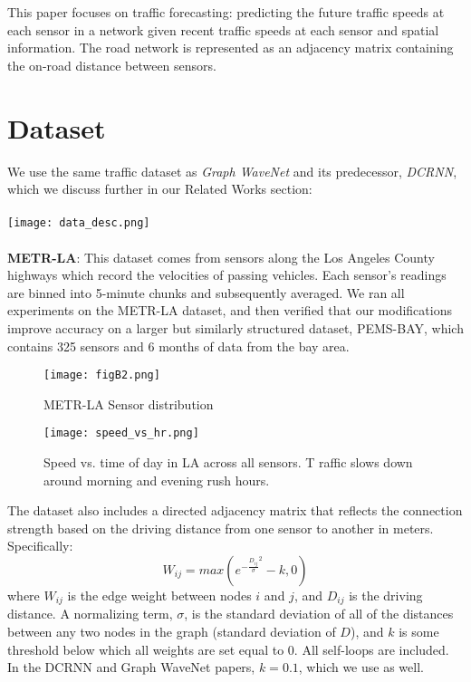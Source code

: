 \documentclass[10pt]{article}
\begin{document}
This paper focuses on traffic forecasting: predicting the future traffic speeds at each sensor in a network given recent traffic speeds at each sensor and spatial information. The road network is represented as an adjacency matrix containing the on-road distance between sensors.

\section{Dataset}

We use the same traffic dataset as \textit{Graph WaveNet} and its predecessor, \textit{DCRNN}, which we discuss further in our Related Works section:\\\\
\texttt{[image: data\_desc.png]} \\\\
\textbf{METR-LA}: This dataset comes from sensors along the Los Angeles County highways which record the velocities of passing vehicles. Each sensor's readings are binned into 5-minute chunks and subsequently averaged. We ran all experiments on the METR-LA dataset, and then verified that our modifications improve accuracy on a larger but similarly structured dataset, PEMS-BAY, which contains 325 sensors and 6 months of data from the bay area.
\begin{table}[H]
    \begin{minipage}{.5\linewidth}
    \centering
    \begin{figure}[H]
        \centering
    \texttt{[image: figB2.png]}
    \caption{METR-LA Sensor distribution}
    \end{figure}
    \end{minipage}
    \begin{minipage}{.5\linewidth}
      \centering
        \begin{figure}[H]
        \texttt{[image: speed\_vs\_hr.png]}
        \caption{Speed vs. time of day in LA across all sensors. T raffic slows down around morning and evening rush hours.}
        \end{figure}
    \end{minipage}
    \label{tab:degree_stats}
\end{table}

The dataset also includes a directed adjacency matrix that reflects the connection strength based on the driving distance from one sensor to another in meters. Specifically:
\[W_{ij} = max(e^{-\frac{D_{ij}}{\sigma}^2} - k, 0)\]
where $W_{ij}$ is the edge weight between nodes $i$ and $j$, and $D_{ij}$ is the driving distance. A normalizing term, $\sigma$, is the standard deviation of all of the distances between any two nodes in the graph (standard deviation of $D$), and $k$ is some threshold below which all weights are set equal to 0. All self-loops are included.  In the DCRNN and Graph WaveNet papers, $k = 0.1$, which we use as well.
\end{document}
